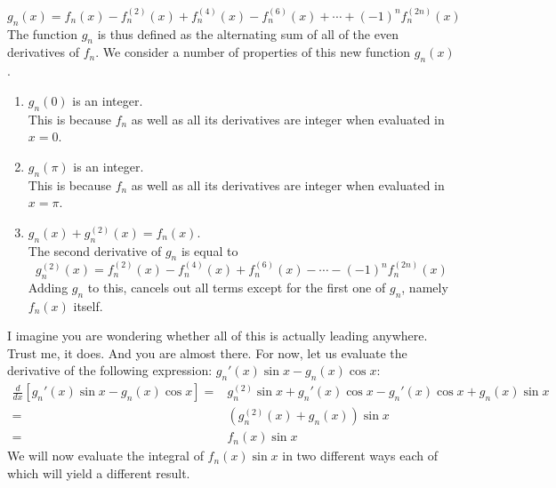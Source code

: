 $$
g_n(x) = f_n(x) - f^{(2)}_{n}(x) + f^{(4)}_{n}(x) - f^{(6)}_{n}(x) + \cdots + \left( -1 \right)^{n} f^{(2n)}_{n}(x)
$$
\noindent The function $g_n$ is thus defined as the alternating sum of all of the even derivatives of $f_n$. We consider a number of properties of this new function $g_n(x)$.
\begin{enumerate}
\item $g_n(0)$ is an integer.\\
\noindent This is because $f_n$ as well as all its derivatives are integer when evaluated in $x=0$.
\item $g_n(\pi)$ is an integer.\\
\noindent This is because $f_n$ as well as all its derivatives are integer when evaluated in $x=\pi$.
\item $g_n (x) + g_{n}^{(2)}(x) = f_n(x)$.\\
\noindent The second derivative of $g_n$ is equal to
$$
g_n^{(2)}(x) = f^{(2)}_{n}(x) - f^{(4)}_{n}(x) + f^{(6)}_{n}(x) - \cdots - \left( -1 \right)^{n} f^{(2n)}_{n}(x)
$$
\noindent Adding $g_n$ to this, cancels out all terms except for the first one of $g_n$, namely $f_n(x)$ itself.
\end{enumerate}
\noindent I imagine you are wondering whether all of this is actually leading anywhere. Trust me, it does. And you are almost there. For now, let us evaluate the derivative of the following expression: $g_n'(x) \sin x - g_n(x) \cos x $:
\begin{eqnarray*}
\frac{d}{dx} \left[ g_n'(x) \sin x - g_n(x) \cos x \right] = & g_{n}^{(2)} \sin x + g_n'(x) \cos x - g_n'(x) \cos x + g_n(x) \sin x \\
 = & \left( g^{(2)}_{n}(x) + g_n(x) \right) \sin x \\
= & f_n (x) \sin x
\end{eqnarray*}
\noindent We will now evaluate the integral of $f_n(x) \sin x$ in two different ways each of which will yield a different result.
